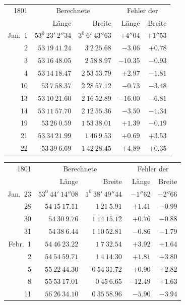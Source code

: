 \begin{center}
{\small\setlength{\tabcolsep}{4pt}
\begin{tabular}{r|r|r|r|r}
1801&\multicolumn{2}{c|}{Berechnete}&\multicolumn{2}{c}{Fehler der}\\
&Länge&Breite&Länge&Breite\\\hline
Jan.\ 1&$53^0\ 23'\ 2''34$&$3^0\ 6'\ 43''63$&$+4''04$&$+1''53$\\
2&$53\ 19\ 41.24$&$3\ 2\ 25.68$&$-3.06$&$+0.78$\\
3&$53\ 16\ 48.05$&$2\ 58\ 8.97$&$-10.35$&$-0.93$\\
4&$53\ 14\ 18.47$&$2\ 53\ 53.79$&$+2.97$&$-1.81$\\
10&$53\ 7\ 58.37$&$2\ 28\ 57.12$&$-0.73$&$-3.48$\\
13&$53\ 10\ 21.60$&$2\ 16\ 52.89$&$-16.00$&$-6.81$\\
14&$53\ 11\ 57.70$&$2\ 12\ 55.36$&$-3.50$&$-1.34$\\
19&$53\ 26\ 0.59$&$1\ 53\ 38.01$&$+1.39$&$-0.19$\\
21&$53\ 34\ 21.99$&$1\ 46\ 9.53$&$+0.69$&$+3.53$\\
22&$53\ 39\ 6.69$&$1\ 42\ 28.45$&$+4.89$&$+0.35$
\end{tabular}
\par\medskip
\begin{tabular}{r|r|r|r|r}
1801&\multicolumn{2}{c|}{Berechnete}&\multicolumn{2}{c}{Fehler der}\\
&Länge&Breite&Länge&Breite\\\hline
Jan.\ 23&$53^0\ 44'\ 14''08$&$1^0\ 38'\ 49''44$&$-1''62$&$-2''66$\\
28&$54\ 15\ 17.11$&$1\ 21\ 5.91$&$+1.41$&$-0.99$\\
30&$54\ 30\ 9.76$&$1\ 14\ 15.12$&$+0.76$&$-0.88$\\
31&$54\ 38\ 6.44$&$1\ 10\ 52.81$&$-0.86$&$-1.79$\\
Febr.\ 1&$54\ 46\ 23.22$&$1\ 7\ 32.54$&$+3.92$&$+1.64$\\
2&$54\ 54\ 59.71$&$1\ 4\ 14.30$&$+1.81$&$+3.80$\\
5&$55\ 22\ 44.30$&$0\ 54\ 31.72$&$+0.90$&$+2.82$\\
8&$55\ 53\ 17.01$&$0\ 45\ 6.65$&$-12.49$&$+1.63$\\
11&$56\ 26\ 34.10$&$0\ 35\ 58.96$&$-5.90$&$-3.94$
\end{tabular}}
\end{center}
